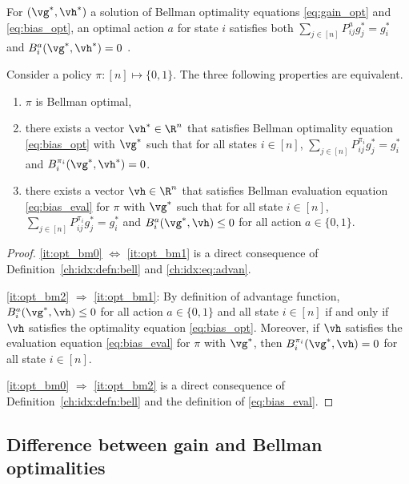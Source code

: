 For $(\vg^*,\vh^*)$ a solution of Bellman optimality equations \eqref{eq:gain_opt} and \eqref{eq:bias_opt},
an optimal action $a$ for state $i$ satisfies both $\sum_{j\in[n]}P^a_{ij}g^*_j =g^*_i$ and $B^a_i(\vg^*,\vh^*)=0$ \cite{puterman2014markov, schweitzer1978functional}.
\begin{lem}
    \label{ch:idx:lem:bell_charac}
    Consider a policy $\pi:[n]\mapsto\{0,1\}$.
    The three following properties are equivalent.
    \begin{enumerate}[label=(\roman*)]
        \item \label{it:opt_bm0} $\pi$ is Bellman optimal,
        \item \label{it:opt_bm1} there exists a vector $\vh^*\in\R^{n}$ that satisfies Bellman optimality equation \eqref{eq:bias_opt} with $\vg^*$ such that for all states $i\in[n]$, $\sum_{j\in[n]}P^{\pi_i}_{ij}g^*_j=g^*_i$ and $B^{\pi_i}_i(\vg^*,\vh^*)=0$.
        \item \label{it:opt_bm2} there exists a vector $\vh\in\R^{n}$ that satisfies Bellman evaluation equation \eqref{eq:bias_eval} for $\pi$ with $\vg^*$ such that for all state $i\in[n]$, $\sum_{j\in[n]}P^{\pi_i}_{ij}g^*_j=g^*_i$ and $B^a_i(\vg^*,\vh)\le0$ for all action $a\in\{0,1\}$.
        \end{enumerate}
\end{lem}
\begin{proof}
    \ref{it:opt_bm0} $\Leftrightarrow$ \ref{it:opt_bm1} is a direct consequence of Definition~\ref{ch:idx:defn:bell} and \eqref{ch:idx:eq:advan}.

    \ref{it:opt_bm2} $\Rightarrow$ \ref{it:opt_bm1}: By definition of advantage function, $B^a_i(\vg^*,\vh)\le0$ for all action $a\in\{0,1\}$ and all state $i\in[n]$ if and only if $\vh$ satisfies the optimality equation \eqref{eq:bias_opt}.
    Moreover, if $\vh$ satisfies the evaluation equation \eqref{eq:bias_eval} for $\pi$ with $\vg^*$, then $B^{\pi_i}_i(\vg^*,\vh)=0$ for all state $i\in[n]$.

    \ref{it:opt_bm0} $\Rightarrow$ \ref{it:opt_bm2} is a direct consequence of Definition~\ref{ch:idx:defn:bell} and the definition of \eqref{eq:bias_eval}.
\end{proof}

\subsection{Difference between gain and Bellman optimalities}
\label{ch:idx:ssec:gain_bell}

